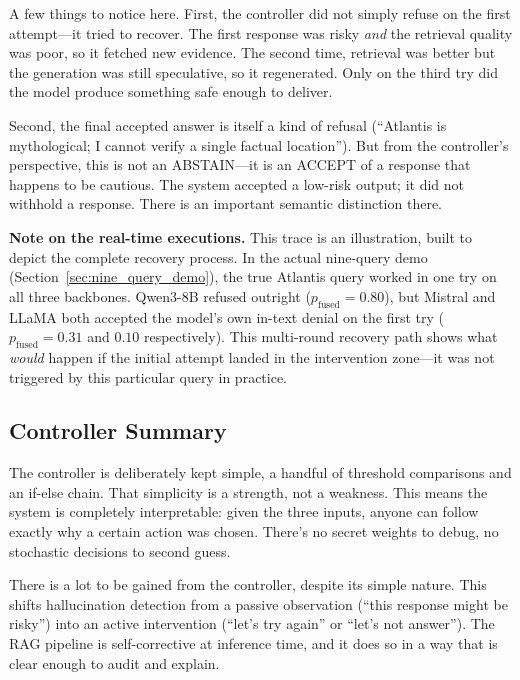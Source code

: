 A few things to notice here. First, the controller did not simply refuse on the first attempt---it tried to recover. The first response was risky \emph{and} the retrieval quality was poor, so it fetched new evidence. The second time, retrieval was better but the generation was still speculative, so it regenerated. Only on the third try did the model produce something safe enough to deliver.

Second, the final accepted answer is itself a kind of refusal (``Atlantis is mythological; I cannot verify a single factual location''). But from the controller's perspective, this is not an ABSTAIN---it is an ACCEPT of a response that happens to be cautious. The system accepted a low-risk output; it did not withhold a response. There is an important semantic distinction there.

\textbf{Note on the real-time executions.} This trace is an illustration, built to depict the complete recovery process. In the actual nine-query demo (Section~\ref{sec:nine_query_demo}), the true Atlantis query worked in one try on all three backbones. Qwen3-8B refused outright ($p_{\text{fused}} = 0.80$), but Mistral and LLaMA both accepted the model's own in-text denial on the first try ($p_{\text{fused}} = 0.31$ and $0.10$ respectively). This multi-round recovery path shows what \emph{would} happen if the initial attempt landed in the intervention zone---it was not triggered by this particular query in practice.

\subsection{Controller Summary}
\label{sec:ch7_summery}

The controller is deliberately kept simple, a handful of threshold comparisons and an if-else chain.  That simplicity is a strength, not a weakness. This means the system is completely interpretable: given the three inputs, anyone can follow exactly why a certain action was chosen. There's no secret weights to debug, no stochastic decisions to second guess.

There is a lot to be gained from the controller, despite its simple nature. This shifts hallucination detection from a passive observation (``this response might be risky'') into an active intervention (``let's try again'' or ``let's not answer''). The RAG pipeline is self-corrective at inference time, and it does so in a way that is clear enough to audit and explain.
